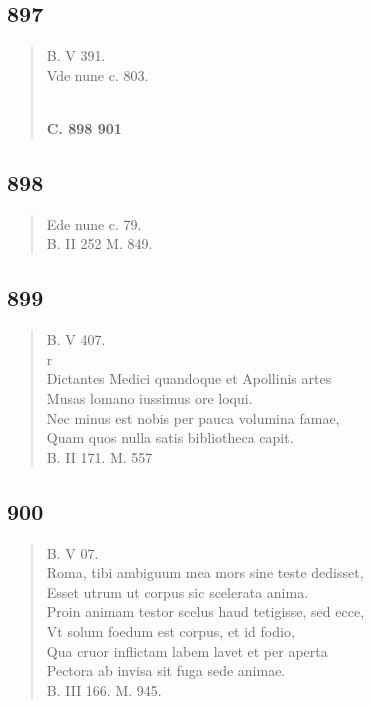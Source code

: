 \documentclass[11pt, a4paper]{report}
\begin{document}
            \subsection*{897}
      \begin{verse}
      B. V 391. \\ Vde nune c. 803. \\ 
        ﻿\pagebreak 
     \marginpar{[340]} \begin{center} \textbf{C. 898 901} \end{center}
      \end{verse}
  
            \subsection*{898}
      \begin{verse}
      Ede nune c. 79. \\ B. II 252 M. 849. \\ 
      \end{verse}
  
            \subsection*{899}
      \begin{verse}
      B. V 407. \\ r \\ Dictantes Medici quandoque et Apollinis artes \\ Musas lomano iussimus ore loqui. \\ Nec minus est nobis per pauca volumina famae, \\ Quam quos nulla satis bibliotheca capit. \\ B. II 171. M. 557 \\ 
      \end{verse}
  
            \subsection*{900}
      \begin{verse}
      B. V 07. \\ Roma, tibi ambiguum mea mors sine teste dedisset, \\ Esset utrum ut corpus sic scelerata anima. \\ Proin animam testor scelus haud tetigisse, sed ecce, \\ Vt solum foedum est corpus, et id fodio, \\ Qua cruor inflictam labem lavet et per aperta \\ Pectora ab invisa sit fuga sede animae. \\ B. III 166. M. 945. \\ 
      \end{verse}
  
\end{document}
